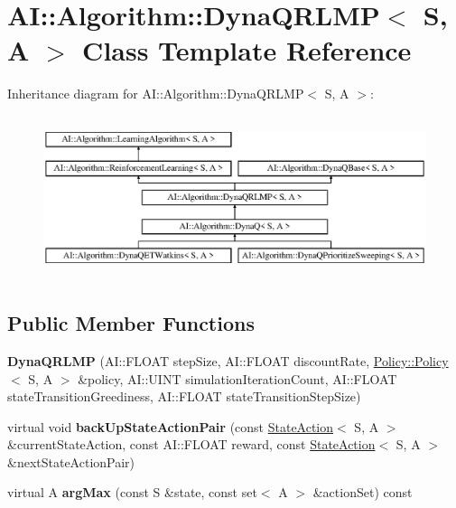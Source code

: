 \hypertarget{classAI_1_1Algorithm_1_1DynaQRLMP}{\section{A\-I\-:\-:Algorithm\-:\-:Dyna\-Q\-R\-L\-M\-P$<$ S, A $>$ Class Template Reference}
\label{classAI_1_1Algorithm_1_1DynaQRLMP}
}
Inheritance diagram for A\-I\-:\-:Algorithm\-:\-:Dyna\-Q\-R\-L\-M\-P$<$ S, A $>$\-:\begin{figure}[H]
\begin{center}
\leavevmode
\includegraphics[height=4.794520cm]{classAI_1_1Algorithm_1_1DynaQRLMP}
\end{center}
\end{figure}
\subsection*{Public Member Functions}
\begin{DoxyCompactItemize}
\item 
\hypertarget{classAI_1_1Algorithm_1_1DynaQRLMP_a79f36f74cf9de4649b07df5d46282598}{{\bfseries Dyna\-Q\-R\-L\-M\-P} (A\-I\-::\-F\-L\-O\-A\-T step\-Size, A\-I\-::\-F\-L\-O\-A\-T discount\-Rate, \hyperlink{classAI_1_1Algorithm_1_1Policy_1_1Policy}{Policy\-::\-Policy}$<$ S, A $>$ \&policy, A\-I\-::\-U\-I\-N\-T simulation\-Iteration\-Count, A\-I\-::\-F\-L\-O\-A\-T state\-Transition\-Greediness, A\-I\-::\-F\-L\-O\-A\-T state\-Transition\-Step\-Size)}\label{classAI_1_1Algorithm_1_1DynaQRLMP_a79f36f74cf9de4649b07df5d46282598}

\item 
\hypertarget{classAI_1_1Algorithm_1_1DynaQRLMP_a7b3b5f3706744290b12c19f786e5e4e4}{virtual void {\bfseries back\-Up\-State\-Action\-Pair} (const \hyperlink{classAI_1_1StateAction}{State\-Action}$<$ S, A $>$ \&current\-State\-Action, const A\-I\-::\-F\-L\-O\-A\-T reward, const \hyperlink{classAI_1_1StateAction}{State\-Action}$<$ S, A $>$ \&next\-State\-Action\-Pair)}\label{classAI_1_1Algorithm_1_1DynaQRLMP_a7b3b5f3706744290b12c19f786e5e4e4}

\item 
\hypertarget{classAI_1_1Algorithm_1_1DynaQRLMP_a57a8d01392c4a3699853f3aa623d9ebf}{virtual A {\bfseries arg\-Max} (const S \&state, const set$<$ A $>$ \&action\-Set) const }\label{classAI_1_1Algorithm_1_1DynaQRLMP_a57a8d01392c4a3699853f3aa623d9ebf}

\end{DoxyCompactItemize}
